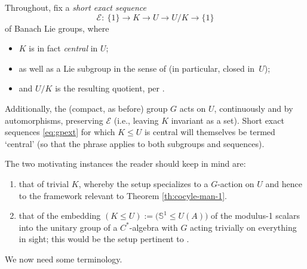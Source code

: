 \documentclass[pdftex]{sigma}
\numberwithin{equation}{section}
\newcommand\bS{{\mathbb S}}
\newcommand\cE{{\mathcal E}}
\begin{document}
Throughout, fix a {\it short exact sequence}
\begin{equation}\label{eq:gpext}
 \cE \colon \
 \{1\}\to K\xrightarrow{\quad} U\xrightarrow{\quad} U/K\to \{1\}
\end{equation}
of Banach Lie groups, where
\begin{itemize}\itemsep=0pt
\item $K$ is in fact {\it central} in $U$;
\item as well as a Lie subgroup in the sense of \cite[Section~III.1.3, Definition~3]{bourb-lie-13} (in particular, closed in~$U$);
\item and $U/K$ is the resulting quotient, per \cite[Section~III.1.6, Proposition~11\,(ii)]{bourb-lie-13}.
\end{itemize}
Additionally, the (compact, as before) group $G$ acts on $U$, continuously and by automorphisms, preserving $\cE$ (i.e., leaving $K$ invariant as a set). Short exact sequences \eqref{eq:gpext} for which $K\le U$ is central will themselves be termed `central' (so that the phrase applies to both subgroups and sequences).

\begin{Examples}\label{exs:motivk}
 The two motivating instances the reader should keep in mind are:
 \begin{enumerate}[(1)]\itemsep=0pt
 \item that of trivial $K$, whereby the setup specializes to a $G$-action on $U$ and hence to the framework relevant to Theorem \ref{th:cocyle-man-1}.
 \item\label{item:motivk-martin} that of the embedding $(K\le U)
 :=
 \big(\bS^1\le U(A)\big)$ of the modulus-1 scalars into the unitary group of a $C^*$-algebra with $G$ acting trivially on everything in sight; this would be the setup pertinent to \cite{mart-proj}.
 \end{enumerate}
\end{Examples}

We now need some terminology.
\end{document}
